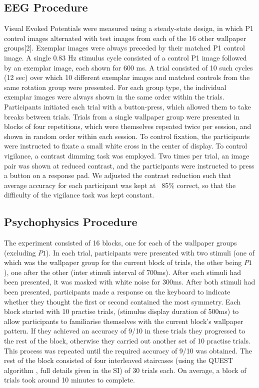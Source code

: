 \documentclass[9pt,twocolumn,twoside,lineno]{pnas-new}
\begin{document}
\subsection*{EEG Procedure}
Visual Evoked Potentials were measured using a steady-state design, in which P1 control images alternated with test images from each of the 16 other wallpaper groups[2]. Exemplar images were always preceded by their matched P1 control image. A single 0.83 Hz stimulus cycle consisted of a control P1 image followed by an exemplar image, each shown for 600 ms. A trial consisted of 10 such cycles (12 sec) over which 10 different exemplar images and matched controls from the same rotation group were presented. For each group type, the individual exemplar images were always shown in the same order within the trials. Participants initiated each trial with a button-press, which allowed them to take breaks between trials. Trials from a single wallpaper group were presented in blocks of four repetitions, which were themselves repeated twice per session, and shown in random order within each session. To control fixation, the participants were instructed to fixate a small white cross in the center of display. To control vigilance, a contrast dimming task was employed. Two times per trial, an image pair was shown at reduced contrast, and the participants were instructed to press a button on a response pad. We adjusted the contrast reduction such that average accuracy for each participant was kept at ~85\% correct, so that the difficulty of the vigilance task was kept constant.     

\subsection*{Psychophysics Procedure}
The experiment consisted of 16 blocks, one for each of the wallpaper groups (excluding $P1$). In each trial, participants were presented with two stimuli (one of which was the wallpaper group for the current block of trials, the other being $P1$), one after the other (inter stimuli interval of 700ms). After each stimuli had been presented, it was masked with white noise for 300ms. After both stimuli had been presented, participants made a response on the keyboard to indicate whether they thought the first or second contained the most symmetry. Each block started with 10 practise trials, (stimulus display duration of 500ms) to allow participants to familiarise themselves with the current block's wallpaper pattern. If they achieved an accuracy of 9/10 in these trials they progressed to the rest of the block, otherwise they carried out another set of 10 practise trials. This process was repeated until the required accuracy of 9/10 was obtained. The rest of the block consisted of four interleaved staircases (using the QUEST algorithm \cite{watson1983quest}, full details given in the SI) of 30 trials each. On average, a block of trials took around 10 minutes to complete. 
\end{document}

